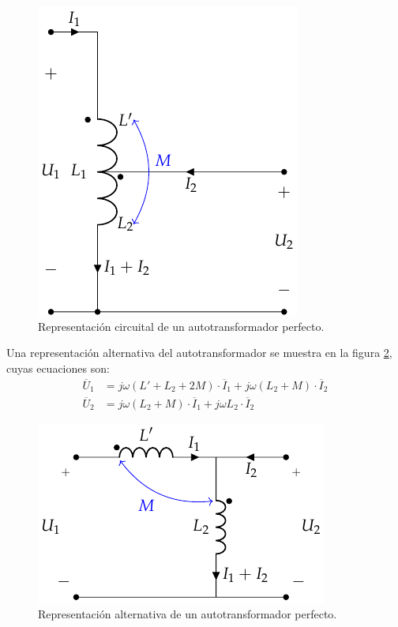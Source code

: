 \begin{figure}\centering
  \includegraphics[height=0.2\textheight]{../figs/AutotrafoPerfecto.pdf}
  \caption{Representación circuital de un autotransformador perfecto.}
  \label{fig:autotrafo-perfecto}
\end{figure}

Una representación alternativa del autotransformador se muestra en la figura \ref{fig:autotrafo-perfecto2}, cuyas ecuaciones son:
\begin{align*}
  \overline{U}_1 &= j \omega (L' + L_2 + 2M) \cdot \overline{I}_1 + j \omega (L_2 + M) \cdot \overline{I}_2\\
  \overline{U}_2 &= j \omega (L_2 + M) \cdot \overline{I}_1 + j \omega L_2 \cdot \overline{I}_2
\end{align*}

\begin{figure}
  \centering
  \includegraphics[height=0.2\textheight]{../figs/AutotrafoPerfecto2.pdf}
  \caption{Representación alternativa de un autotransformador perfecto.}
  \label{fig:autotrafo-perfecto2}
\end{figure}

